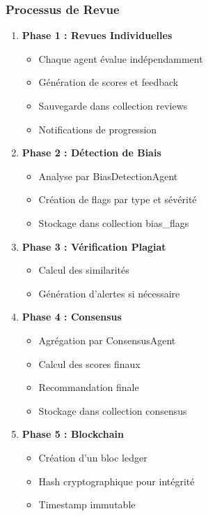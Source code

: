 \documentclass[12pt,a4paper]{article}
\begin{document}
\subsubsection{Processus de Revue}
\begin{enumerate}
    \item \textbf{Phase 1 : Revues Individuelles}
    \begin{itemize}
        \item Chaque agent évalue indépendamment
        \item Génération de scores et feedback
        \item Sauvegarde dans collection reviews
        \item Notifications de progression
    \end{itemize}
    
    \item \textbf{Phase 2 : Détection de Biais}
    \begin{itemize}
        \item Analyse par BiasDetectionAgent
        \item Création de flags par type et sévérité
        \item Stockage dans collection bias\_flags
    \end{itemize}
    
    \item \textbf{Phase 3 : Vérification Plagiat}
    \begin{itemize}
        \item Calcul des similarités
        \item Génération d'alertes si nécessaire
    \end{itemize}
    
    \item \textbf{Phase 4 : Consensus}
    \begin{itemize}
        \item Agrégation par ConsensusAgent
        \item Calcul des scores finaux
        \item Recommandation finale
        \item Stockage dans collection consensus
    \end{itemize}
    
    \item \textbf{Phase 5 : Blockchain}
    \begin{itemize}
        \item Création d'un bloc ledger
        \item Hash cryptographique pour intégrité
        \item Timestamp immutable
    \end{itemize}
\end{enumerate}
\end{document}
